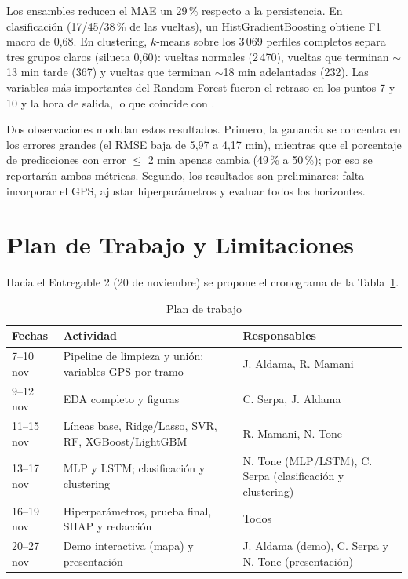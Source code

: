 \documentclass[conference,spanish]{IEEEtran}
\begin{document}
Los ensambles reducen el MAE un 29\,\% respecto a la persistencia. En clasificación (17/45/38\,\% de las vueltas), un HistGradientBoosting obtiene F1 macro de 0,68. En clustering, $k$-means sobre los 3\,069 perfiles completos separa tres grupos claros (silueta 0,60): vueltas normales (2\,470), vueltas que terminan $\sim$13 min tarde (367) y vueltas que terminan $\sim$18 min adelantadas (232). Las variables más importantes del Random Forest fueron el retraso en los puntos 7 y 10 y la hora de salida, lo que coincide con \cite{martyanov2026}.

Dos observaciones modulan estos resultados. Primero, la ganancia se concentra en los errores grandes (el RMSE baja de 5,97 a 4,17 min), mientras que el porcentaje de predicciones con error $\le$ 2 min apenas cambia (49\,\% a 50\,\%); por eso se reportarán ambas métricas. Segundo, los resultados son preliminares: falta incorporar el GPS, ajustar hiperparámetros y evaluar todos los horizontes.

\section{Plan de Trabajo y Limitaciones}

Hacia el Entregable 2 (20 de noviembre) se propone el cronograma de la Tabla~\ref{tab:plan}.

\begin{table}[h]
\centering
\caption{Plan de trabajo}
\label{tab:plan}
\footnotesize
\begin{tabular}{@{}p{1.3cm}p{3.6cm}p{2.4cm}@{}}
\toprule
\textbf{Fechas} & \textbf{Actividad} & \textbf{Responsables}\\
\midrule
7--10 nov & Pipeline de limpieza y unión; variables GPS por tramo & J. Aldama, R. Mamani\\
9--12 nov & EDA completo y figuras & C. Serpa, J. Aldama\\
11--15 nov & Líneas base, Ridge/Lasso, SVR, RF, XGBoost/LightGBM & R. Mamani, N. Tone\\
13--17 nov & MLP y LSTM; clasificación y clustering & N. Tone (MLP/LSTM), C. Serpa (clasificación y clustering)\\
16--19 nov & Hiperparámetros, prueba final, SHAP y redacción & Todos\\
20--27 nov & Demo interactiva (mapa) y presentación & J. Aldama (demo), C. Serpa y N. Tone (presentación)\\
\bottomrule
\end{tabular}
\end{table}
\end{document}

